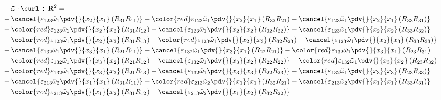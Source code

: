 \begin{equation}
	\begin{split}
&-\mathbf{\tilde{\omega}}\cdot\curl \div \mathbf{R}^2 = \\&		-\cancel{\varepsilon_{123}\tilde{\omega}_{1}\pdv{}{x_{2}}{x_{1}}\left(R_{31}R_{11}\right)}
		-{\color{red}\varepsilon_{123}\tilde{\omega}_{1}\pdv{}{x_{2}}{x_{1}}\left(R_{32}R_{21}\right)}
		-\cancel{\varepsilon_{123}\tilde{\omega}_{1}\pdv{}{x_{2}}{x_{1}}\left(R_{33}R_{31}\right)}\\
&		-{\color{red}\varepsilon_{123}\tilde{\omega}_{1}\pdv{}{x_{2}}{x_{2}}\left(R_{31}R_{12}\right)}
		-\cancel{\varepsilon_{123}\tilde{\omega}_{1}\pdv{}{x_{2}}{x_{2}}\left(R_{32}R_{22}\right)}
		-\cancel{\varepsilon_{123}\tilde{\omega}_{1}\pdv{}{x_{2}}{x_{2}}\left(R_{33}R_{32}\right)}\\
&		-{\color{red}\varepsilon_{123}\tilde{\omega}_{1}\pdv{}{x_{2}}{x_{3}}\left(R_{31}R_{13}\right)}
		-{\color{red}\varepsilon_{123}\tilde{\omega}_{1}\pdv{}{x_{2}}{x_{3}}\left(R_{32}R_{23}\right)}
		-\cancel{\varepsilon_{123}\tilde{\omega}_{1}\pdv{}{x_{2}}{x_{3}}\left(R_{33}R_{33}\right)}\\
&		-\cancel{\varepsilon_{132}\tilde{\omega}_{1}\pdv{}{x_{3}}{x_{1}}\left(R_{21}R_{11}\right)}
		-\cancel{\varepsilon_{132}\tilde{\omega}_{1}\pdv{}{x_{3}}{x_{1}}\left(R_{22}R_{21}\right)}
		-{\color{red}\varepsilon_{132}\tilde{\omega}_{1}\pdv{}{x_{3}}{x_{1}}\left(R_{23}R_{31}\right)}\\
&		-{\color{red}\varepsilon_{132}\tilde{\omega}_{1}\pdv{}{x_{3}}{x_{2}}\left(R_{21}R_{12}\right)}
		-\cancel{\varepsilon_{132}\tilde{\omega}_{1}\pdv{}{x_{3}}{x_{2}}\left(R_{22}R_{22}\right)}
		-{\color{red}\varepsilon_{132}\tilde{\omega}_{1}\pdv{}{x_{3}}{x_{2}}\left(R_{23}R_{32}\right)}\\
&		-{\color{red}\varepsilon_{132}\tilde{\omega}_{1}\pdv{}{x_{3}}{x_{3}}\left(R_{21}R_{13}\right)}
		-\cancel{\varepsilon_{132}\tilde{\omega}_{1}\pdv{}{x_{3}}{x_{3}}\left(R_{22}R_{23}\right)}
		-\cancel{\varepsilon_{132}\tilde{\omega}_{1}\pdv{}{x_{3}}{x_{3}}\left(R_{23}R_{33}\right)}\\
&		-\cancel{\varepsilon_{213}\tilde{\omega}_{2}\pdv{}{x_{1}}{x_{1}}\left(R_{31}R_{11}\right)}
		-{\color{red}\varepsilon_{213}\tilde{\omega}_{2}\pdv{}{x_{1}}{x_{1}}\left(R_{32}R_{21}\right)}
		-\cancel{\varepsilon_{213}\tilde{\omega}_{2}\pdv{}{x_{1}}{x_{1}}\left(R_{33}R_{31}\right)}\\
&		-{\color{red}\varepsilon_{213}\tilde{\omega}_{2}\pdv{}{x_{1}}{x_{2}}\left(R_{31}R_{12}\right)}
		-\cancel{\varepsilon_{213}\tilde{\omega}_{2}\pdv{}{x_{1}}{x_{2}}\left(R_{32}R_{22}\right)}

\end{split}
\end{equation}
